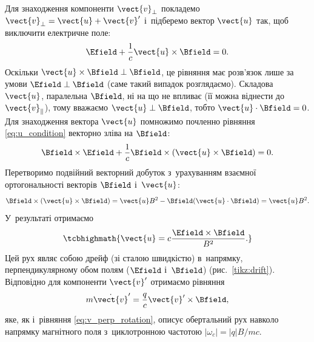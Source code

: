 Для знаходження компоненти $\vect{v}_{\perp}$ покладемо $\vect{v}_{\perp} = \vect{u} + \vect{v}'$ і~підберемо вектор $\vect{u}$ так, щоб виключити електричне поле:
\begin{equation}\label{eq:u_condition}
	\Efield + \frac{1}{c}\vect{u} \times \Bfield = 0.
\end{equation}
Оскільки $\vect{u}\times\Bfield \perp \Bfield$, це рівняння має розв'язок лише за умови $\Efield \perp \Bfield$ (саме такий випадок розглядаємо). Складова $\vect{u}$, паралельна $\Bfield$, ні на що не впливає (її можна віднести до $\vect{v}_{\parallel}$), тому вважаємо $\vect{u} \perp \Bfield$, тобто $\vect{u}\cdot\Bfield = 0$. Для знаходження вектора $\vect{u}$ помножимо почленно рівняння \eqref{eq:u_condition} векторно зліва на $\Bfield$:
\begin{equation}\label{eq:u_cross_B}
	\Bfield \times \Efield + \frac{1}{c}\Bfield \times (\vect{u} \times \Bfield) = 0.
\end{equation}
Перетворимо подвійний векторний добуток з~урахуванням взаємної ортогональності векторів $\Bfield$ і~$\vect{u}$:
\begin{equation}\label{eq:double_cross}
	\Bfield \times (\vect{u} \times \Bfield) = \vect{u}B^2 - \Bfield(\vect{u}\cdot\Bfield) = \vect{u}B^2.
\end{equation}
У~результаті отримаємо
\begin{equation}\label{eq:drift_velocity}
	\tcbhighmath{
		\vect{u} = c\frac{\Efield \times \Bfield}{B^2}.
	}
\end{equation}
Цей рух являє собою дрейф (зі сталою швидкістю) в~напрямку, перпендикулярному обом полям ($\Efield$ і~$\Bfield$) (рис.~\ref{tikz:drift}). Відповідно для компоненти $\vect{v}'$ отримаємо рівняння
\begin{equation}\label{eq:v_prime_rotation}
	m\dot{\vect{v}}' = \frac{q}{c}\vect{v}' \times \Bfield,
\end{equation}
яке, як і~рівняння \eqref{eq:v_perp_rotation}, описує обертальний рух навколо напрямку магнітного поля з~циклотронною частотою $|\omega_c| = |q|B/mc$.

